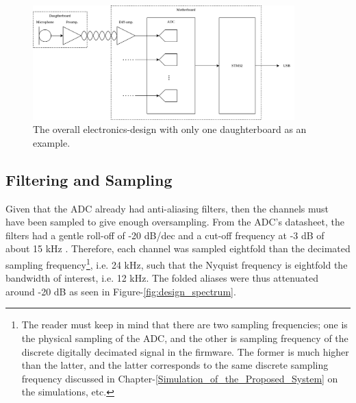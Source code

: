 \documentclass[notitlepage]{report}
\begin{document}
\begin{figure}[H]
\includegraphics[width=0.9\textwidth]{./design_overall.png}
\centering
\caption{The overall electronics-design with only one daughterboard as an example.}
\label{fig:design_overall}
\centering
\end{figure}

%
%	
%	

\subsection{Filtering and Sampling}

Given that the ADC already had anti-aliasing filters, then the channels must have been sampled to give enough oversampling. From the ADC's datasheet, the filters had a gentle roll-off of -20 \si{dB/dec} and a cut-off frequency at -3 \si{dB} of about 15 \si{kHz} \cite{noauthor_8-channel_2021}. Therefore, each channel was sampled eightfold than the decimated sampling frequency\footnote{The reader must keep in mind that there are two sampling frequencies; one is the physical sampling of the ADC, and the other is sampling frequency of the discrete digitally decimated signal in the firmware. The former is much higher than the latter, and the latter corresponds to the same discrete sampling frequency discussed in Chapter-\ref{Simulation_of_the_Proposed_System} on the simulations, etc.}, i.e. 24 \si{kHz}, such that the Nyquist frequency is eightfold the bandwidth of interest, i.e. 12 \si{kHz}. The folded aliases were thus attenuated around -20 \si{dB} as seen in Figure-\ref{fig:design_spectrum}.
\end{document}
